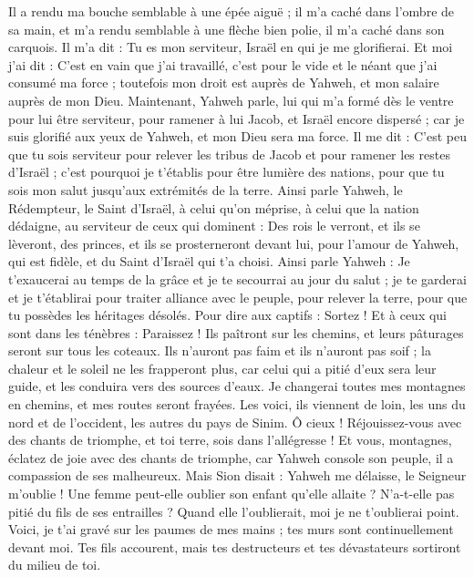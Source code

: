 \begin{multicols}{2}
Il a rendu ma bouche semblable à une épée aiguë ; il m'a caché dans l'ombre de sa main, et m'a rendu semblable à une flèche bien polie, il m'a caché dans son carquois.
Il m'a dit : Tu es mon serviteur, Israël en qui je me glorifierai.
Et moi j'ai dit : C'est en vain que j'ai travaillé, c'est pour le vide et le néant que j'ai consumé ma force ; toutefois mon droit est auprès de Yahweh, et mon salaire auprès de mon Dieu.
Maintenant, Yahweh parle, lui qui m'a formé dès le ventre pour lui être serviteur, pour ramener à lui Jacob, et Israël encore dispersé ; car je suis glorifié aux yeux de Yahweh, et mon Dieu sera ma force.
Il me dit : C'est peu que tu sois serviteur pour relever les tribus de Jacob et pour ramener les restes d'Israël ; c'est pourquoi je t'établis pour être lumière des nations, pour que tu sois mon salut jusqu'aux extrémités de la terre.
Ainsi parle Yahweh, le Rédempteur, le Saint d'Israël, à celui qu'on méprise, à celui que la nation dédaigne, au serviteur de ceux qui dominent : Des rois le verront, et ils se lèveront, des princes, et ils se prosterneront devant lui, pour l'amour de Yahweh, qui est fidèle, et du Saint d'Israël qui t'a choisi.
Ainsi parle Yahweh : Je t'exaucerai au temps de la grâce et je te secourrai au jour du salut ; je te garderai et je t'établirai pour traiter alliance avec le peuple, pour relever la terre, pour que tu possèdes les héritages désolés.
Pour dire aux captifs : Sortez ! Et à ceux qui sont dans les ténèbres : Paraissez ! Ils paîtront sur les chemins, et leurs pâturages seront sur tous les coteaux.
Ils n'auront pas faim et ils n'auront pas soif ; la chaleur et le soleil ne les frapperont plus, car celui qui a pitié d'eux sera leur guide, et les conduira vers des sources d'eaux.
Je changerai toutes mes montagnes en chemins, et mes routes seront frayées.
Les voici, ils viennent de loin, les uns du nord et de l'occident, les autres du pays de Sinim.
Ô cieux ! Réjouissez-vous avec des chants de triomphe, et toi terre, sois dans l'allégresse ! Et vous, montagnes, éclatez de joie avec des chants de triomphe, car Yahweh console son peuple, il a compassion de ses malheureux.
Mais Sion disait : Yahweh me délaisse, le Seigneur m'oublie !
Une femme peut-elle oublier son enfant qu'elle allaite ? N'a-t-elle pas pitié du fils de ses entrailles ? Quand elle l'oublierait, moi je ne t'oublierai point.
Voici, je t'ai gravé sur les paumes de mes mains ; tes murs sont continuellement devant moi.
Tes fils accourent, mais tes destructeurs et tes dévastateurs sortiront du milieu de toi.

\end{multicols}
